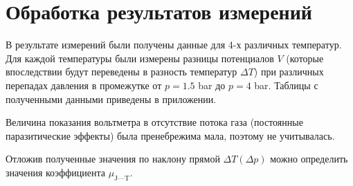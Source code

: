 \documentclass[a4paper,12pt]{report}
\begin{document}
    \newpage
    \section{Обработка результатов измерений}
    \begin{multicols}{2}
        В результате измерений были получены данные для 4-х различных температур. Для каждой температуры были измерены разницы потенциалов $V$ (которые впоследствии будут переведены в разность температур $\Delta T$) при различных перепадах давления в промежутке от $p=1.5$ bar до $p=4$ bar. Таблицы с полученными данными приведены в приложении.
        
        Величина показания вольтметра в отсутствие потока газа  (постоянные паразитические эффекты) была пренебрежима мала, поэтому не учитывалась.

        Отложив полученные значения по наклону прямой $\Delta T (\Delta p)$ можно определить значения коэффициента $\mu_{\text{J---T}}$.
    \end{multicols}
\end{document}
